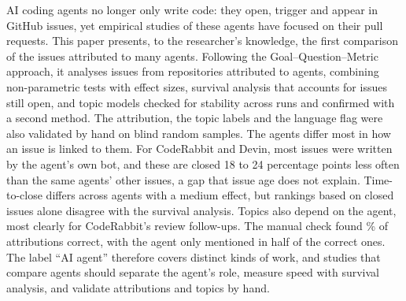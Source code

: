 AI coding agents no longer only write code: they open, trigger and appear in GitHub issues, yet empirical studies of these agents have focused on their pull requests. This paper presents, to the researcher's knowledge, the first comparison of the issues attributed to many agents. Following the Goal--Question--Metric approach, it analyses \NIssues{} issues from \NRepos{} repositories attributed to \NAgents{} agents, combining non-parametric tests with effect sizes, survival analysis that accounts for issues still open, and topic models checked for stability across runs and confirmed with a second method. The attribution, the topic labels and the language flag were also validated by hand on blind random samples. The agents differ most in how an issue is linked to them. For CodeRabbit and Devin, most issues were written by the agent's own bot, and these are closed 18 to 24 percentage points less often than the same agents' other issues, a gap that issue age does not explain. Time-to-close differs across agents with a medium effect, but rankings based on closed issues alone disagree with the survival analysis. Topics also depend on the agent, most clearly for CodeRabbit's review follow-ups. The manual check found \ValCorrectPct\% of attributions correct, with the agent only mentioned in half of the correct ones. The label ``AI agent'' therefore covers distinct kinds of work, and studies that compare agents should separate the agent's role, measure speed with survival analysis, and validate attributions and topics by hand.

